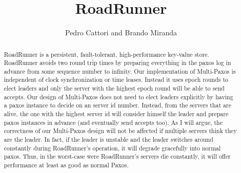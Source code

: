 \documentclass[a4paper]{article}
\title{RoadRunner}
\author{Pedro Cattori and Brando Miranda}
\begin{document}
\maketitle

\begin{abstract}
RoadRunner is a persistent, fault-tolerant, high-performance key-value store. 
RoadRunner avoids two round trip times by preparing everything in the paxos log in advance from some sequence number to infinity. 
Our implementation of Multi-Paxos is independent of clock synchronization or time leases. Instead it uses epoch rounds to elect leaders and only the server with the highest epoch round will be able to send accepts. 
Our design of Multi-Paxos does not need to elect leaders explicitly by having a paxos instance to decide on an server id number.
Instead, from the servers that are alive, the one with the highest server id will consider himself the leader and prepare paxos instances in advance (and eventually send accepts too).
As I will argue, the correctness of our Multi-Paxos design will not be affected if multiple servers think they are the leader. In fact, if the leader is unstable and the leader switches around constantly during RoadRunner's operation, it will degrade gracefully into normal paxos. Thus, in the worst-case were RoadRunner's servers die constantly, it will offer performance at least as good as normal Paxos.
\end{abstract}
\end{document}
